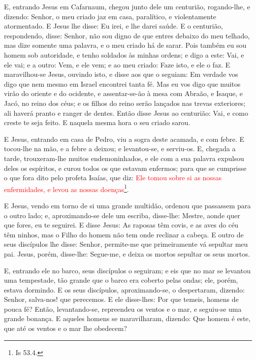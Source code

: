 E, entrando Jesus em Cafarnaum, chegou junto dele um centurião,
rogando-lhe, e dizendo: Senhor, o meu criado jaz em casa,
paralítico, e violentamente atormentado. E Jesus lhe disse: Eu
irei, e lhe darei saúde. E o centurião, respondendo, disse:
Senhor, não sou digno de que entres debaixo do meu telhado, mas dize
somente uma palavra, e o meu criado há de sarar. Pois também eu
sou homem sob autoridade, e tenho soldados às minhas ordens; e digo
a este: Vai, e ele vai; e a outro: Vem, e ele vem; e ao meu criado:
Faze isto, e ele o faz. E maravilhou-se Jesus, ouvindo isto,
e disse aos que o seguiam: Em verdade vos digo que nem mesmo em
Israel encontrei tanta fé. Mas eu vos digo que muitos virão
do oriente e do ocidente, e assentar-se-ão à mesa com Abraão, e
Isaque, e Jacó, no reino dos céus; e os filhos do reino serão
lançados nas trevas exteriores; ali haverá pranto e ranger de
dentes. Então disse Jesus ao centurião: Vai, e como creste te
seja feito. E naquela mesma hora o seu criado sarou.

E Jesus, entrando em casa de Pedro, viu a sogra deste acamada, e
com febre. E tocou-lhe na mão, e a febre a deixou; e
levantou-se, e serviu-os. E, chegada a tarde, trouxeram-lhe
muitos endemoninhados, e ele com a sua palavra expulsou deles os
espíritos, e curou todos os que estavam enfermos; para que se
cumprisse o que fora dito pelo profeta Isaías, que diz: \textcolor{red}{Ele
tomou sobre si as nossas enfermidades, e levou as nossas
doenças}\footnote{Is 53.4.}.

E Jesus, vendo em torno de si uma grande multidão, ordenou que
passassem para o outro lado; e, aproximando-se dele um
escriba, disse-lhe: Mestre, aonde quer que fores, eu te seguirei.
E disse Jesus: As raposas têm covis, e as aves do céu têm
ninhos, mas o Filho do homem não tem onde reclinar a cabeça.
E outro de seus discípulos lhe disse: Senhor, permite-me que
primeiramente vá sepultar meu pai. Jesus, porém, disse-lhe:
Segue-me, e deixa os mortos sepultar os seus mortos.

E, entrando ele no barco, seus discípulos o seguiram; e
eis que no mar se levantou uma tempestade, tão grande que o barco
era coberto pelas ondas; ele, porém, estava dormindo. E os
seus discípulos, aproximando-se, o despertaram, dizendo: Senhor,
salva-nos! que perecemos. E ele disse-lhes: Por que temeis,
homens de pouca fé? Então, levantando-se, repreendeu os ventos e o
mar, e seguiu-se uma grande bonança. E aqueles homens se
maravilharam, dizendo: Que homem é este, que até os ventos e o mar
lhe obedecem?

